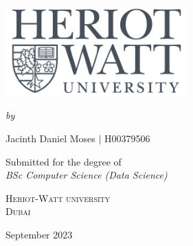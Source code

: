 \documentclass[12pt,a4paper]{report}
\author{Jacinth Daniel Moses $|$ H00379506}
\begin{document}
\begin{titlepage}
    \begin{center}
    \begin{spacing}{1.8}
    {\Large\bfseries\MakeUppercase{}}\\
    \end{spacing}
    
    \vspace{40pt}\par
    \includegraphics[width=7cm]{Figures/HWlOGO.png}
    \vspace{40pt}\par
    {\itshape\fontsize{15.5pt}{19pt}\selectfont by\\}\vspace{15pt}\par
    {\Large Jacinth Daniel Moses $|$ H00379506}\vspace{55pt}\par
    {\large Submitted for the degree of \\ \vspace{8pt} \Large\slshape{BSc Computer Science (Data Science)}\\}
    \vspace{35pt}\par
    {\scshape{} Heriot-Watt university\\ Dubai}
    \vspace{50pt}\par
    {\large September 2023}
    \end{center}
\end{titlepage}





\tableofcontents
\clearpage


\end{document}
